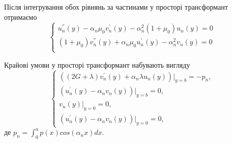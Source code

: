 Після інтегрування обох рівнянь за частинами у просторі трансформант отримаємо
\begin{equation}\label{transf_static_1}
    \begin{cases}
        u_n^{''}(y) - \alpha_n \mu_0 v_n^{'}(y) - \alpha_n^2 (1 + \mu_0) u_n(y) = 0 \\
        (1 + \mu_0) v_n^{''}(y) + \alpha_n \mu_0 u_n^{'}(y)  - \alpha_n^2 v_n(y) = 0 \\
    \end{cases}
\end{equation}

Крайові умови у просторі трансформант набувають вигляду
\begin{equation}\label{transf_bound_static_1}
    \begin{cases}
        \left( (2G + \lambda)v_n^{'}(y) + \alpha_n \lambda u_n(y) \right)|_{y=b} = -p_n, \\
        \left(u_n^{'}(y) - \alpha_n v_n(y)  \right)|_{y=b} = 0, \\
        v_n(y)|_{y=0} = 0, \\
        \left(u_n^{'}(y) - \alpha_n v_n(y)  \right)|_{y=0} = 0,
    \end{cases}
\end{equation}
де $p_n = \int_{0}^{a} p(x) cos(\alpha_n x) dx$.


